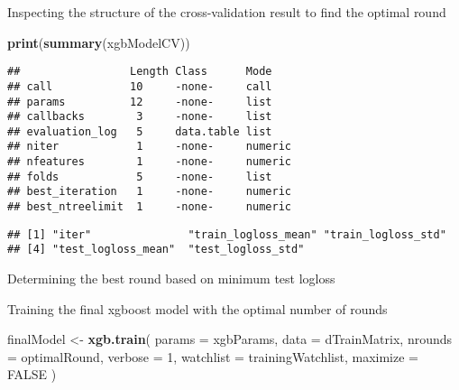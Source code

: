 \documentclass[
]{article}
\newenvironment{Shaded}{\begin{snugshade}}{\end{snugshade}}
\newcommand{\AttributeTok}[1]{\textcolor[rgb]{0.13,0.29,0.53}{#1}}
\newcommand{\ConstantTok}[1]{\textcolor[rgb]{0.56,0.35,0.01}{#1}}
\newcommand{\DecValTok}[1]{\textcolor[rgb]{0.00,0.00,0.81}{#1}}
\newcommand{\FunctionTok}[1]{\textcolor[rgb]{0.13,0.29,0.53}{\textbf{#1}}}
\newcommand{\NormalTok}[1]{#1}
\newcommand{\OtherTok}[1]{\textcolor[rgb]{0.56,0.35,0.01}{#1}}
\newcommand{\SpecialCharTok}[1]{\textcolor[rgb]{0.81,0.36,0.00}{\textbf{#1}}}
\begin{document}
Inspecting the structure of the cross-validation result to find the
optimal round

\begin{Shaded}
\begin{Highlighting}[]
\FunctionTok{print}\NormalTok{(}\FunctionTok{summary}\NormalTok{(xgbModelCV))}
\end{Highlighting}
\end{Shaded}

\begin{verbatim}
##                 Length Class      Mode   
## call            10     -none-     call   
## params          12     -none-     list   
## callbacks        3     -none-     list   
## evaluation_log   5     data.table list   
## niter            1     -none-     numeric
## nfeatures        1     -none-     numeric
## folds            5     -none-     list   
## best_iteration   1     -none-     numeric
## best_ntreelimit  1     -none-     numeric
\end{verbatim}

\begin{Shaded}
\end{Shaded}

\begin{verbatim}
## [1] "iter"               "train_logloss_mean" "train_logloss_std" 
## [4] "test_logloss_mean"  "test_logloss_std"
\end{verbatim}

Determining the best round based on minimum test logloss

\begin{Shaded}
\end{Shaded}

Training the final xgboost model with the optimal number of rounds

\begin{Shaded}
\begin{Highlighting}[]
\NormalTok{finalModel }\OtherTok{\textless{}{-}} \FunctionTok{xgb.train}\NormalTok{(}
  \AttributeTok{params =}\NormalTok{ xgbParams, }
  \AttributeTok{data =}\NormalTok{ dTrainMatrix, }
  \AttributeTok{nrounds =}\NormalTok{ optimalRound, }
  \AttributeTok{verbose =} \DecValTok{1}\NormalTok{,}
  \AttributeTok{watchlist =}\NormalTok{ trainingWatchlist,}
  \AttributeTok{maximize =} \ConstantTok{FALSE}
\NormalTok{)}
\end{Highlighting}
\end{Shaded}
\end{document}
